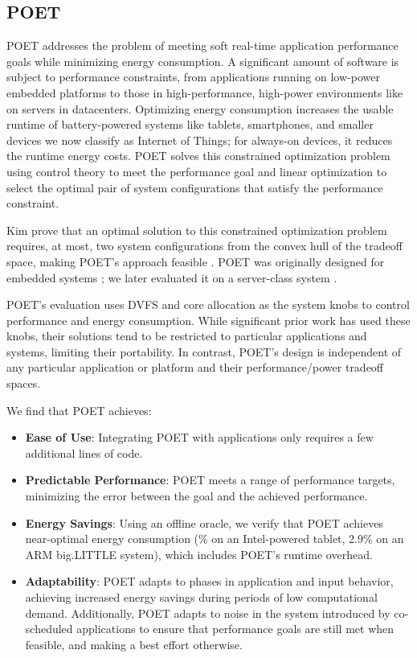 \subsection{POET}

POET addresses the problem of meeting soft real-time application performance goals while minimizing energy consumption.
A significant amount of software is subject to performance constraints, from applications running on low-power embedded platforms to those in high-performance, high-power environments like on servers in datacenters.
Optimizing energy consumption increases the usable runtime of battery-powered systems like tablets, smartphones, and smaller devices we now classify as Internet of Things; for always-on devices, it reduces the runtime energy costs.
POET solves this constrained optimization problem using control theory to meet the performance goal and linear optimization to select the optimal pair of system configurations that satisfy the performance constraint.

Kim \etal prove that an optimal solution to this constrained optimization problem requires, at most, two system configurations from the convex hull of the tradeoff space, making POET's approach feasible \cite{kim-cpsna2015}.
POET was originally designed for embedded systems \cite{POET}; we later evaluated it on a server-class system \cite{POETMCSoC}.

POET's evaluation uses DVFS and core allocation as the system knobs to control performance and energy consumption.
While significant prior work has used these knobs, their solutions tend to be restricted to particular applications and systems, limiting their portability.
In contrast, POET's design is independent of any particular application or platform and their performance/power tradeoff spaces.

We find that POET achieves:
\begin{itemize}
\item \textbf{Ease of Use}: Integrating POET with applications only requires a few additional lines of code.
\item \textbf{Predictable Performance}: POET meets a range of performance targets, minimizing the error between the goal and the achieved performance.
\item \textbf{Energy Savings}: Using an offline oracle, we verify that POET achieves near-optimal energy consumption (\% on an Intel-powered tablet, 2.9\% on an ARM big.LITTLE system), which includes POET's runtime overhead.
\item \textbf{Adaptability}: POET adapts to phases in application and input behavior, achieving increased energy savings during periods of low computational demand.
Additionally, POET adapts to noise in the system introduced by co-scheduled applications to ensure that performance goals are still met when feasible, and making a best effort otherwise.
\end{itemize}


